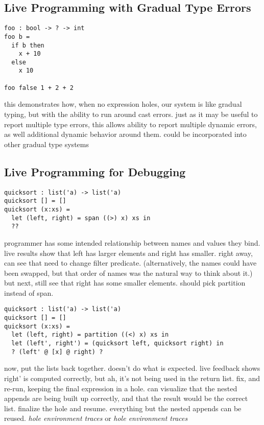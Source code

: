 \subsection{Live Programming with Gradual Type Errors}



\begin{lstlisting}
foo : bool -> ? -> int
foo b =
  if b then
    x + 10
  else
    x 10

foo false 1 + 2 + 2
\end{lstlisting}

this demonstrates how, when no expression holes, our system is like gradual
typing, but with the ability to run around cast errors.
%
just as it may be useful to report multiple type errors, this allows ability to
report multiple dynamic errors, as well additional dynamic behavior around them.
%
could be incorporated into other gradual type systems


\subsection{Live Programming for Debugging}




\begin{lstlisting}
quicksort : list('a) -> list('a)
quicksort [] = []
quicksort (x:xs) =
  let (left, right) = span ((>) x) xs in
  ??
\end{lstlisting}

programmer has some intended relationship between names and values they bind.
%
live results show that left has larger elements and right has smaller.
%
right away, can see that need to change filter predicate. (alternatively, the
names could have been swapped, but that order of names was the natural way
to think about it.)
%
but next, still see that right has some smaller elements.
%
should pick partition instead of span.

\begin{lstlisting}
quicksort : list('a) -> list('a)
quicksort [] = []
quicksort (x:xs) =
  let (left, right) = partition ((<) x) xs in
  let (left', right') = (quicksort left, quicksort right) in
  ? (left' @ [x] @ right) ?
\end{lstlisting}

now, put the lists back together.
%
doesn't do what is expected.
%
live feedback shows right' is computed correctly, but ah, it's not being used
in the return list.
%
fix, and re-run, keeping the final expression in a hole.
%
can visualize that the nested appends are being built up correctly, and that the
result would be the correct list.
%
finalize the hole and resume. everything but the nested appends can be reused.
%
\emph{hole environment traces} or \emph{hole environment traces}
